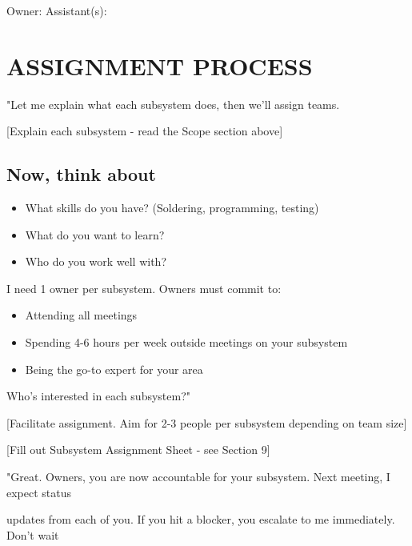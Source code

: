 \documentclass[11pt,letterpaper]{article}
\begin{document}
{Owner: \underline{\hspace{4.05cm}}  Assistant(s): \underline{\hspace{4.6499999999999995cm}}\par

\section{ASSIGNMENT PROCESS}

"Let me explain what each subsystem does, then we'll assign teams.\par

[Explain each subsystem - read the Scope section above]\par

\subsection{Now, think about}

\begin{itemize}
  \item What skills do you have? (Soldering, programming, testing)
  \item What do you want to learn?
  \item Who do you work well with?
\end{itemize}

I need 1 owner per subsystem. Owners must commit to:\par

\begin{itemize}
  \item Attending all meetings
  \item Spending 4-6 hours per week outside meetings on your subsystem
  \item Being the go-to expert for your area
\end{itemize}

Who's interested in each subsystem?"\par

[Facilitate assignment. Aim for 2-3 people per subsystem depending on team size]\par

[Fill out Subsystem Assignment Sheet - see Section 9]\par

"Great. Owners, you are now accountable for your subsystem. Next meeting, I expect status\par

updates from each of you. If you hit a blocker, you escalate to me immediately. Don't wait\par

}
\end{document}
